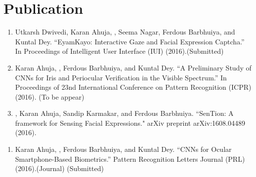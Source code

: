 \section{Publication}
\begin{enumerate}
    \item Utkarsh Dwivedi, Karan Ahuja, , Seema Nagar, Ferdous Barbhuiya, and Kuntal Dey. “EyamKayo: Interactive Gaze and Facial Expression Captcha.”  In Proceedings of Intelligent User Interface (IUI) (2016).(Submitted)
    \item Karan Ahuja, , Ferdous Barbhuiya, and Kuntal Dey. “A Preliminary Study of CNNs for Iris and Periocular Verification in the Visible Spectrum.”  In Proceedings of 23nd International Conference on Pattern Recognition (ICPR) (2016). (To be appear) 
    \item {}, Karan Ahuja, Sandip Karmakar, and Ferdous Barbhuiya. “SenTion: A framework for Sensing Facial Expressions." arXiv preprint arXiv:1608.04489 (2016).
\end{enumerate}

\sectionsep
{}
\begin{enumerate}
    \item Karan Ahuja, , Ferdous Barbhuiya, and Kuntal Dey. “CNNs for Ocular Smartphone-Based Biometrics.”  Pattern Recognition Letters Journal (PRL) (2016).(Journal) (Submitted)
\end{enumerate}